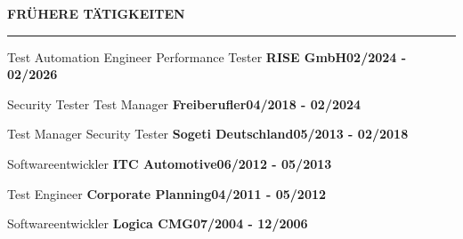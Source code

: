 \documentclass[9pt,a4paper]{article}
\newcommand{\maintitle}[1]{{\color{accent}\fontsize{7.0}{7.5}\selectfont\bfseries\MakeUppercase{#1}\par}{\color{rulefg}\rule{\linewidth}{0.25pt}\par}\vspace{0.8mm}}
\newcommand{\entryperiod}[1]{{\color{accent}\fontsize{5.35}{6.4}\selectfont\bfseries\MakeUppercase{#1}}}
\newlength{\mainwidth}
\begin{document}
\begin{minipage}[t]{\mainwidth}
\vspace{4.5mm}
\maintitle{Fr{\"u}here T{\"a}tigkeiten}
{\color{mutedfg}\fontsize{5.75}{7.5}\selectfont Test Automation Engineer \textperiodcentered{} Performance Tester \textbar{} {\bfseries\color{textfg}RISE GmbH}\hfill\entryperiod{02/2024 - 02/2026}\par}
\vspace{0.85mm}
{\color{mutedfg}\fontsize{5.75}{7.5}\selectfont Security Tester \textperiodcentered{} Test Manager \textbar{} {\bfseries\color{textfg}Freiberufler}\hfill\entryperiod{04/2018 - 02/2024}\par}
\vspace{0.85mm}
{\color{mutedfg}\fontsize{5.75}{7.5}\selectfont Test Manager \textperiodcentered{} Security Tester \textbar{} {\bfseries\color{textfg}Sogeti Deutschland}\hfill\entryperiod{05/2013 - 02/2018}\par}
\vspace{0.85mm}
{\color{mutedfg}\fontsize{5.75}{7.5}\selectfont Softwareentwickler \textbar{} {\bfseries\color{textfg}ITC Automotive}\hfill\entryperiod{06/2012 - 05/2013}\par}
\vspace{0.85mm}
{\color{mutedfg}\fontsize{5.75}{7.5}\selectfont Test Engineer \textbar{} {\bfseries\color{textfg}Corporate Planning}\hfill\entryperiod{04/2011 - 05/2012}\par}
\vspace{0.85mm}
{\color{mutedfg}\fontsize{5.75}{7.5}\selectfont Softwareentwickler \textbar{} {\bfseries\color{textfg}Logica CMG}\hfill\entryperiod{07/2004 - 12/2006}\par}
\vspace{0.85mm}
\end{minipage}
\end{document}
